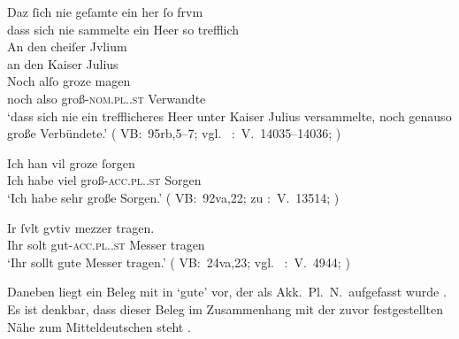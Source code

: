 \begin{exe}
\ex \label{ex:kcvbregel}
	\begin{xlist}
	\ex \label{ex:kcvbregel_1}
		\gll Daz ſich nie geſamte ein her ſo frvm \\
			dass sich nie sammelte ein Heer so trefflich \\
	\sn \gll An den cheiſer Jvlium \\
			an den Kaiser Julius \\
	\sn \gll Noch alſo groze magen \\
			noch also groß-\textsc{nom.pl.\MascM.st} Verwandte \\
		\trans `dass sich nie ein trefflicheres Heer unter Kaiser Julius 
			versammelte, noch genauso große Verbündete.'
			(%
				VB:~95rb,5--7; vgl.~%
				\KC:~V.~14035--14036;
				\cite[335]{schroeder1895}%
			)

	\ex \label{ex:kcvbregel_2}
		\gll Ich han vil groze ſorgen \\
			Ich habe viel groß-\textsc{acc.pl.\FemI.st} Sorgen \\
		\trans `Ich habe sehr große Sorgen.'
			(%
				VB:~92va,22; zu
				\KC:~V.~13514;
				\cite[309]{schroeder1895}%
			)

	\ex \label{ex:kcvbregel_3}
		\gll Ir ſvlt gvtiv mezzer tragen. \\
			Ihr solt gut-\textsc{acc.pl.\NeutI.st} Messer tragen \\
		\trans `Ihr sollt gute Messer tragen.'
			(%
				VB:~24va,23; vgl.~%
				\KC:~V.~4944;
				\cite[172]{schroeder1895}%
			)
	\end{xlist}
\end{exe}

Daneben liegt ein Beleg mit  in  `gute' vor, der als Akk.\
Pl.\ N.\ aufgefasst wurde . Es ist denkbar, dass dieser
Beleg im Zusammenhang mit der zuvor festgestellten Nähe zum
Mitteldeutschen steht \autocites(siehe auch
)[vgl.][181--184]{ksw2}.

